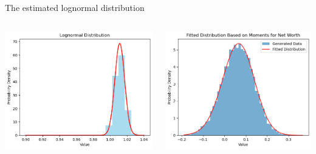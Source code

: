 \documentclass{beamer}
\begin{document}
\begin{frame}{The estimated lognormal distribution}
\begin{columns}
    \centering
    \includegraphics[width=\textwidth]{Figures/estimated-PYlognrm.png}
    
    \centering
    \includegraphics[width=\textwidth]{Figures/Table3QuantileMatchingNetWorth.png}

  \end{columns}
\end{frame}
\end{document}
